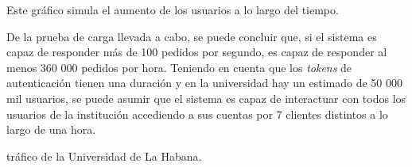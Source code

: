 Este gráfico simula el aumento de los usuarios a lo largo del tiempo.

De la prueba de carga llevada a cabo, se puede concluir que, si el sistema es capaz de responder más de 100 pedidos por segundo, es capaz de responder al menos 360 000 pedidos por hora. Teniendo en cuenta que los \textit{tokens} de autenticación tienen una duración y en la universidad hay un estimado de 50 000 mil usuarios, se puede asumir que el sistema es capaz de interactuar con todos los usuarios de la institución accediendo a sus cuentas por 7 clientes distintos a lo largo de una hora.

 tráfico de la Universidad de La Habana.

